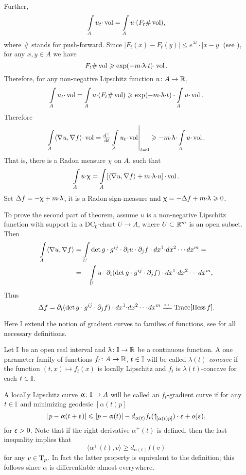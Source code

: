 \documentclass[oneside,a4paper]{article}
\begin{document}
Further,
$$\int\limits_A u_t{\cdot}\mathop{\rm vol}\nolimits=\int\limits_A u{\cdot}(F_t\#\mathop{\rm vol}\nolimits),$$ 
where $\#$ stands for push-forward. 
Since $|F_t(x)-F_t(y)|\le e^{\lambda t}{\cdot}|x-y|$  
(see \cite[2.1.4(i)]{petrunin:survey}), 
for any $x,y\in A$ we have
$$F_t\#\mathop{\rm vol}\nolimits\geqslant \exp(-m{\cdot}\uplambda{\cdot} t){\cdot}\mathop{\rm vol}\nolimits.$$
Therefore, for any non-negative Lipschitz function $u\colon A\to\mathbb{R}$,
$$\int\limits_A u_t{\cdot}\mathop{\rm vol}\nolimits
=
\int\limits_A u{\cdot} (F_t\#\mathop{\rm vol}\nolimits)
\geqslant
\exp(-m{\cdot}\uplambda{\cdot} t)\cdot\int\limits_A u{\cdot}\mathop{\rm vol}\nolimits.$$
Therefore
$$\int\limits_A\langle\nabla u,\nabla f\rangle{\cdot}\mathop{\rm vol}\nolimits 
=
\!\left.\tfrac{d^+}{d t}\int\limits_A u_t{\cdot}\mathop{\rm vol}\nolimits\right|_{t=0}
\geqslant
-m{\cdot}\uplambda{\cdot}\int\limits_A u{\cdot}\mathop{\rm vol}\nolimits.$$
That is, there is a Radon measure $\chi$ on $A$, such that
$$\int\limits_A u{\cdot}\upchi
=
\int\limits_A\!\left[\langle\nabla u,\nabla f\rangle+m{\cdot}\uplambda{\cdot} u\right]{\cdot}\mathop{\rm vol}\nolimits.$$
Set $\Delta f=-\upchi+m{\cdot}\uplambda$, 
it is a Radon sign-measure and $\upchi=-\Delta f+m{\cdot}\uplambda\geqslant 0$.

To prove the second part of theorem,
assume $u$ is a non-negative Lipschitz function with support in a DC$_0$-chart $U\to A$,
where $U\subset \mathbb{R}^m$ is an open subset.
Then 
\begin{align*}
\int\limits_A\langle\nabla u,\nabla f\rangle
&=
\int\limits_U \det g\cdot g^{i j}\cdot\partial_i u\cdot\partial_j f \cdot 
d x^1{\cdot}d x^2\cdots d x^m
=
\\
&=-\int\limits_U u\cdot\partial_i(\det g\cdot g^{i j}\cdot\partial_j f) \cdot d x^1{\cdot}d x^2\cdots d x^m,
\end{align*}
Thus 
$$\Lap f
=
\partial_i(\det g\cdot g^{i j}\cdot\partial_j f)\cdot d x^1{\cdot}d x^2\cdots d x^m
\ae \Trace[\Hess f].$$
\qedsf

 Here I extend the notion of gradient curves to  families of functions, see \cite{petrunin:survey} for all necessary definitions.

Let $\mathbb{I}$ be an open real interval
and $\uplambda\colon\mathbb{I}\to\mathbb{R}$ be a continuous function.
A one parameter family of functions $f_t\colon A\to \mathbb{R}$, $t\in \mathbb{I}$ will be called \emph{$\lambda(t)$-concave} if the function $(t,x)\mapsto f_t(x)$ is locally Lipschitz 
and $f_t$ is $\lambda(t)$-concave for each $t\in \mathbb{I}$.

A locally Lipschitz curve $\upalpha\colon\mathbb{I}\to A$ will be called an $f_t$-gradient curve
if for any $t\in \mathbb{I}$ and minimizing geodesic $[\alpha(t)p]$ 
\[|p-\upalpha(t+\upvarepsilon)|\leqslant |p-\upalpha(t)|-d_{\upalpha(t)}f_t({\uparrow}_{\![{\upalpha(t)}{p}]})\cdot\upvarepsilon+o(\upvarepsilon),\]
for $\upvarepsilon>0$.
Note that if the right derivative $\alpha^+(t)$ is defined, then the last inequality implies that
\[\langle\alpha^+(t),v\rangle\ge d_{\alpha(t)}f(v)\]
for any $v\in\text{\rm T}_p$.
In fact the latter property is equivalent to the definition;
this follows since $\alpha$ is differentiable almost everywhere.
\end{document}
